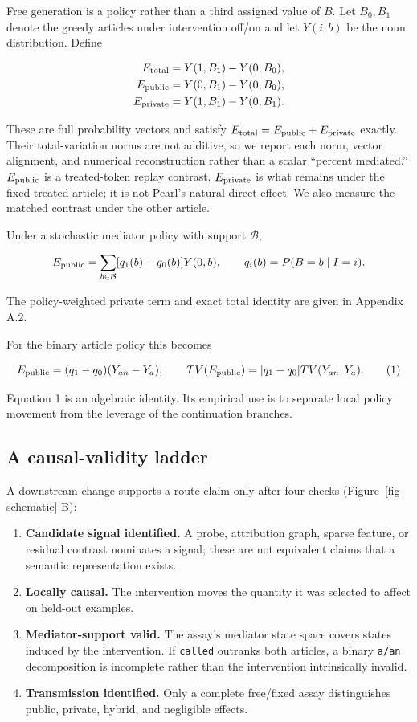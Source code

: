\documentclass[
]{article}
\providecommand{\tightlist}{%
  \setlength{\itemsep}{0pt}\setlength{\parskip}{0pt}}
\begin{document}
Free generation is a policy rather than a third assigned value of \(B\).
Let \(B_0,B_1\) denote the greedy articles under intervention off/on and
let \(Y(i,b)\) be the noun distribution. Define

\[
\begin{aligned}
E_{\rm total}&=Y(1,B_1)-Y(0,B_0),\\
E_{\rm public}&=Y(0,B_1)-Y(0,B_0),\\
E_{\rm private}&=Y(1,B_1)-Y(0,B_1).
\end{aligned}
\]

These are full probability vectors and satisfy
\(E_{\rm total}=E_{\rm public}+E_{\rm private}\) exactly. Their
total-variation norms are not additive, so we report each norm, vector
alignment, and numerical reconstruction rather than a scalar ``percent
mediated.'' \(E_{\rm public}\) is a treated-token replay contrast.
\(E_{\rm private}\) is what remains under the fixed treated article; it
is not Pearl's natural direct effect. We also measure the matched
contrast under the other article.

Under a stochastic mediator policy with support \(\mathcal B\),

\[
E_{\rm public}=\sum_{b\in\mathcal B}
[q_1(b)-q_0(b)]Y(0,b),\qquad q_i(b)=P(B=b\mid I=i).
\]

The policy-weighted private term and exact total identity are given in
Appendix A.2.

For the binary article policy this becomes

\[
E_{\rm public}=(q_1-q_0)(Y_{an}-Y_a),\qquad
TV(E_{\rm public})=|q_1-q_0|TV(Y_{an},Y_a). \tag{1}
\]

Equation 1 is an algebraic identity. Its empirical use is to separate
local policy movement from the leverage of the continuation branches.

\subsection{A causal-validity ladder}\label{a-causal-validity-ladder}

A downstream change supports a route claim only after four checks
(Figure~\ref{fig-schematic} B):

\begin{enumerate}
\def\labelenumi{\arabic{enumi}.}
\tightlist
\item
  \textbf{Candidate signal identified.} A probe, attribution graph,
  sparse feature, or residual contrast nominates a signal; these are not
  equivalent claims that a semantic representation exists.
\item
  \textbf{Locally causal.} The intervention moves the quantity it was
  selected to affect on held-out examples.
\item
  \textbf{Mediator-support valid.} The assay's mediator state space
  covers states induced by the intervention. If \texttt{called} outranks
  both articles, a binary \texttt{a/an} decomposition is incomplete
  rather than the intervention intrinsically invalid.
\item
  \textbf{Transmission identified.} Only a complete free/fixed assay
  distinguishes public, private, hybrid, and negligible effects.
\end{enumerate}
\end{document}
